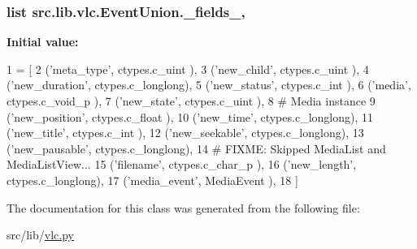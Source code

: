 \subsubsection[{\+\_\+fields\+\_\+}]{\setlength{\rightskip}{0pt plus 5cm}list src.\+lib.\+vlc.\+Event\+Union.\+\_\+fields\+\_\+\hspace{0.3cm}{\ttfamily [static]}, {\ttfamily [private]}}\label{classsrc_1_1lib_1_1vlc_1_1EventUnion_aadde1d5693ac89f6f6e3169a33481ef6}
{\bfseries Initial value\+:}
\begin{DoxyCode}
1 = [
2         (\textcolor{stringliteral}{'meta\_type'},    ctypes.c\_uint    ),
3         (\textcolor{stringliteral}{'new\_child'},    ctypes.c\_uint    ),
4         (\textcolor{stringliteral}{'new\_duration'}, ctypes.c\_longlong),
5         (\textcolor{stringliteral}{'new\_status'},   ctypes.c\_int     ),
6         (\textcolor{stringliteral}{'media'},        ctypes.c\_void\_p  ),
7         (\textcolor{stringliteral}{'new\_state'},    ctypes.c\_uint    ),
8         \textcolor{comment}{# Media instance}
9         (\textcolor{stringliteral}{'new\_position'}, ctypes.c\_float   ),
10         (\textcolor{stringliteral}{'new\_time'},     ctypes.c\_longlong),
11         (\textcolor{stringliteral}{'new\_title'},    ctypes.c\_int     ),
12         (\textcolor{stringliteral}{'new\_seekable'}, ctypes.c\_longlong),
13         (\textcolor{stringliteral}{'new\_pausable'}, ctypes.c\_longlong),
14         \textcolor{comment}{# FIXME: Skipped MediaList and MediaListView...}
15         (\textcolor{stringliteral}{'filename'},     ctypes.c\_char\_p  ),
16         (\textcolor{stringliteral}{'new\_length'},   ctypes.c\_longlong),
17         (\textcolor{stringliteral}{'media\_event'},  MediaEvent       ),
18     ]
\end{DoxyCode}


The documentation for this class was generated from the following file\+:\begin{DoxyCompactItemize}
\item 
src/lib/\hyperlink{vlc_8py}{vlc.\+py}\end{DoxyCompactItemize}
